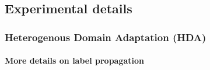 


\subsection{Experimental details} \label{sec_app:exp}

\subsubsection{Heterogenous Domain Adaptation (HDA)}

\paragraph{More details on label propagation}

